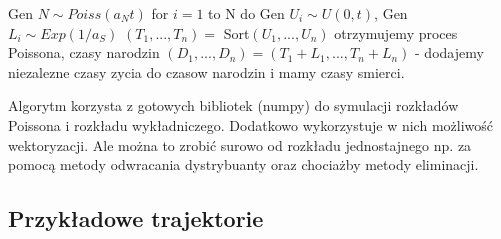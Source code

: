 \documentclass{article}
\begin{document}
\begin{algorithmic}
\State Gen $N \sim \textit{Poiss}(a_Nt)$
\State for $i = 1$ to N do Gen $U_i \sim U(0, t)$, Gen $L_i \sim \textit{Exp}(1/a_S)$
\State $(T_1, ..., T_n) =$ Sort$(U_1, ..., U_n)$ otrzymujemy proces Poissona, czasy narodzin
\State $(D_1, ..., D_n) = (T_1 + L_1, ..., T_n + L_n)$ - dodajemy niezalezne czasy zycia do czasow narodzin i mamy czasy smierci.
\end{algorithmic}  


Algorytm korzysta z gotowych bibliotek (numpy) do symulacji rozkładów Poissona i rozkładu wykładniczego. Dodatkowo wykorzystuje w nich możliwość wektoryzacji. Ale można to zrobić surowo od rozkładu jednostajnego np. za pomocą metody odwracania dystrybuanty oraz chociażby metody eliminacji.

\subsection{Przykładowe trajektorie}
\end{document}
